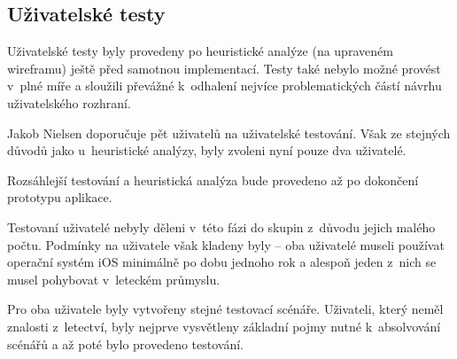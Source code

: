 \documentclass[thesis=M,czech]{FITthesis}[2012/06/26]
\begin{document}
\subsection{Uživatelské testy}
Uživatelské testy byly provedeny po heuristické analýze (na upraveném wireframu) ještě před samotnou implementací. Testy také nebylo možné provést v~plné míře a sloužili převážné k~odhalení nejvíce problematických částí návrhu uživatelského rozhraní.

Jakob Nielsen \cite{usabilityTestingNNG} doporučuje pět uživatelů na uživatelské testování. Však ze stejných důvodů jako u~heuristické analýzy, byly zvoleni nyní pouze dva uživatelé.

Rozsáhlejší testování a heuristická analýza bude provedeno až po dokončení prototypu aplikace.

Testovaní uživatelé nebyly děleni v~této fázi do skupin z~důvodu jejich malého počtu. Podmínky na uživatele však kladeny byly -- oba uživatelé museli používat operační systém iOS minimálně po dobu jednoho rok a alespoň jeden z~nich se musel pohybovat v~leteckém průmyslu.

Pro oba uživatele byly vytvořeny stejné testovací scénáře. Uživateli, který neměl znalosti z~letectví, byly nejprve vysvětleny základní pojmy nutné k~absolvování scénářů a až poté bylo provedeno testování.
\end{document}
